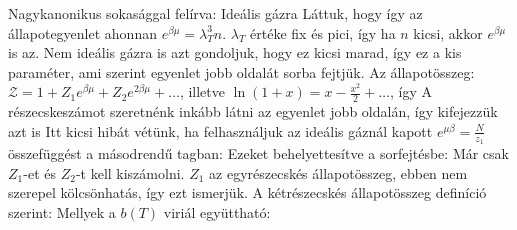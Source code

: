    Nagykanonikus sokasággal felírva:
   Ideális gázra Láttuk, hogy 
   így az állapotegyenlet
   ahonnan $e^{\beta\mu}=\lambda_T^3 n$. $\lambda_T$ értéke fix és pici, így ha $n$ kicsi, akkor $e^{\beta\mu}$ is az. Nem ideális gázra is azt gondoljuk, hogy ez kicsi marad, így ez a kis paraméter, ami szerint  egyenlet jobb oldalát sorba fejtjük. Az állapotösszeg: $\mathcal{Z}=1+Z_1 e^{\beta\mu}+Z_2 e^{2\beta\mu}+\dots$, illetve $\ln(1+x)=x-\frac{x^2}{2}+\dots$, így
   A részecskeszámot szeretnénk inkább látni az egyenlet jobb oldalán, így kifejezzük azt is
   Itt kicsi hibát vétünk, ha felhasználjuk az ideális gáznál kapott $e^{\mu\beta}=\frac{N}{z_1}$ összefüggést a másodrendű tagban:
   Ezeket behelyettesítve a sorfejtésbe:
   Már csak $Z_1$-et és $Z_2$-t kell kiszámolni. $Z_1$ az egyrészecskés állapotösszeg, ebben nem szerepel kölcsönhatás, így ezt ismerjük. A kétrészecskés állapotösszeg definíció szerint:
   Mellyek a $b(T)$ viriál együttható:
   
